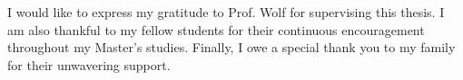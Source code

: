 I would like to express my gratitude to Prof. Wolf for supervising this thesis. I am also thankful to my fellow students for their continuous encouragement throughout my Master's studies. Finally, I owe a special thank you to my family for their unwavering support.
